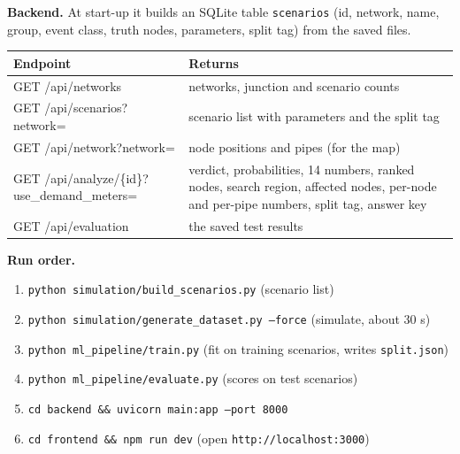 \documentclass[11pt,a4paper]{article}
\newcommand{\code}[1]{\texttt{#1}}
\begin{document}
\textbf{Backend.} At start-up it builds an SQLite table \code{scenarios} (id, network, name, group, event class, truth nodes, parameters, split tag) from the saved files.
\begin{center}\small\begin{tabularx}{\linewidth}{@{}>{\ttfamily}p{5.1cm}Y@{}}\toprule
Endpoint & Returns \\\midrule
GET /api/networks & networks, junction and scenario counts \\
GET /api/scenarios?network= & scenario list with parameters and the split tag \\
GET /api/network?network= & node positions and pipes (for the map) \\
GET /api/analyze/\{id\}?use\_demand\_meters= & verdict, probabilities, 14 numbers, ranked nodes, search region, affected nodes, per-node and per-pipe numbers, split tag, answer key \\
GET /api/evaluation & the saved test results \\\bottomrule\end{tabularx}\end{center}
\textbf{Run order.}
\begin{enumerate}
\item \code{python simulation/build\_scenarios.py} \quad (scenario list)
\item \code{python simulation/generate\_dataset.py --force} \quad (simulate, about 30 s)
\item \code{python ml\_pipeline/train.py} \quad (fit on training scenarios, writes \code{split.json})
\item \code{python ml\_pipeline/evaluate.py} \quad (scores on test scenarios)
\item \code{cd backend \&\& uvicorn main:app --port 8000}
\item \code{cd frontend \&\& npm run dev} \quad (open \code{http://localhost:3000})
\end{enumerate}
\end{document}
